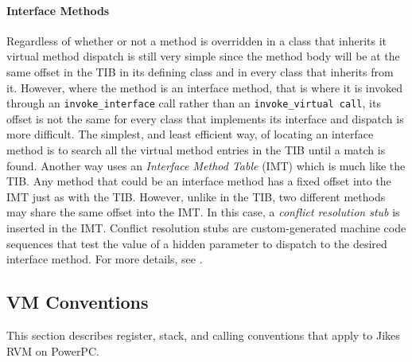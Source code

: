 \paragraph{Interface Methods}
Regardless of whether or not a method is overridden in a class that inherits it
virtual method dispatch is still very simple since the method body will be at
the same offset in the TIB in its defining class and in every class that 
inherits from it. 
However, where the method is an interface method, 
that is where it is invoked through an {\tt invoke\_interface} call rather than
an {\tt invoke\_virtual call}, its offset is not the same for every class that 
implements its interface and dispatch is more difficult.
The simplest, and least efficient way, of locating an interface method 
is to search all the virtual method entries in the TIB until a match is found.
Another way uses an {\em Interface Method Table} (IMT) which is much like the 
TIB. Any method that could be an interface method has a fixed offset into the 
IMT just as with the TIB. However, unlike in the TIB, two different methods may
share the same offset into the IMT. In this case, a {\em conflict resolution
stub} is inserted in the IMT. Conflict resolution stubs are
custom-generated machine code sequences that test the value of a
hidden parameter to dispatch to the desired interface method.
For more details, see
.

\JikesTMFooter

\subsection{VM Conventions}

 \label{aix-conventions}
 \label{aix-conventions}


This section describes register, stack, and calling conventions that apply to 
Jikes RVM on PowerPC\PowerPCTMFootnote.

